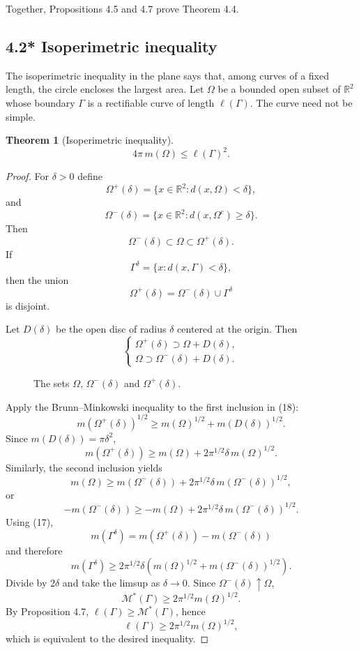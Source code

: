 \documentclass[11pt,openany]{book}
\newtheorem{theorem}{Theorem}[section]
\begin{document}
Together, Propositions 4.5 and 4.7 prove Theorem 4.4.

\subsection*{4.2* Isoperimetric inequality}

The isoperimetric inequality in the plane says that, among curves of a fixed length, the circle encloses the largest area. Let $\Omega$ be a bounded open subset of $\mathbb R^2$ whose boundary $\Gamma$ is a rectifiable curve of length $\ell(\Gamma)$. The curve need not be simple.

\begin{theorem}[Isoperimetric inequality]
\[
4\pi\,m(\Omega)\le\ell(\Gamma)^2.
\]
\end{theorem}

\begin{proof}
For $\delta>0$ define
\[
\Omega^+(\delta)=\{x\in\mathbb R^2:d(x,\Omega)<\delta\},
\]
and
\[
\Omega^-(\delta)=\{x\in\mathbb R^2:d(x,\Omega^c)\ge\delta\}.
\]
Then
\[
\Omega^-(\delta)\subset\Omega\subset\Omega^+(\delta).
\]
If
\[
\Gamma^\delta=\{x:d(x,\Gamma)<\delta\},
\]
then the union
\begin{equation}
\Omega^+(\delta)=\Omega^-(\delta)\cup\Gamma^\delta
\tag{17}
\end{equation}
is disjoint.

Let $D(\delta)$ be the open disc of radius $\delta$ centered at the origin. Then
\begin{equation}
\begin{cases}
\Omega^+(\delta)\supset\Omega+D(\delta),\\
\Omega\supset\Omega^-(\delta)+D(\delta).
\end{cases}
\tag{18}
\end{equation}

\begin{figure}[ht]
\centering
{}
\caption{The sets $\Omega$, $\Omega^-(\delta)$ and $\Omega^+(\delta)$.}
\end{figure}

Apply the Brunn--Minkowski inequality to the first inclusion in (18):
\[
m(\Omega^+(\delta))^{1/2}
\ge m(\Omega)^{1/2}+m(D(\delta))^{1/2}.
\]
Since $m(D(\delta))=\pi\delta^2$,
\[
m(\Omega^+(\delta))
\ge m(\Omega)+2\pi^{1/2}\delta\,m(\Omega)^{1/2}.
\]
Similarly, the second inclusion yields
\[
m(\Omega)
\ge m(\Omega^-(\delta))
 +2\pi^{1/2}\delta\,m(\Omega^-(\delta))^{1/2},
\]
or
\[
-m(\Omega^-(\delta))
\ge -m(\Omega)+2\pi^{1/2}\delta\,m(\Omega^-(\delta))^{1/2}.
\]
Using (17),
\[
m(\Gamma^\delta)
=m(\Omega^+(\delta))-m(\Omega^-(\delta))
\]
and therefore
\[
m(\Gamma^\delta)
\ge2\pi^{1/2}\delta
\left(m(\Omega)^{1/2}+m(\Omega^-(\delta))^{1/2}\right).
\]
Divide by $2\delta$ and take the limsup as $\delta\to0$. Since $\Omega^-(\delta)\uparrow\Omega$,
\[
\mathcal M^*(\Gamma)
\ge2\pi^{1/2}m(\Omega)^{1/2}.
\]
By Proposition 4.7, $\ell(\Gamma)\ge\mathcal M^*(\Gamma)$, hence
\[
\ell(\Gamma)\ge2\pi^{1/2}m(\Omega)^{1/2},
\]
which is equivalent to the desired inequality.
\end{proof}
\end{document}

